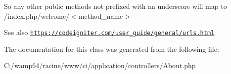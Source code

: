 So any other public methods not prefixed with an underscore will map to /index.php/welcome/$<$method\+\_\+name$>$ \begin{DoxySeeAlso}{See also}
\href{https://codeigniter.com/user_guide/general/urls.html}{\tt https\+://codeigniter.\+com/user\+\_\+guide/general/urls.\+html} 
\end{DoxySeeAlso}


The documentation for this class was generated from the following file\+:\begin{DoxyCompactItemize}
\item 
C\+:/wamp64/racine/www/ci/application/controllers/About.\+php\end{DoxyCompactItemize}

